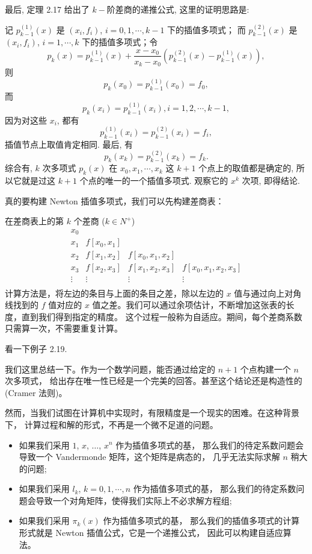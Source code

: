 \documentclass[a4paper]{ctexart}
\begin{document}
最后, 定理 2.17 给出了 $k-$阶差商的递推公式, 这里的证明思路是:

记 $p_{k - 1}^{(1)}(x)$ 是 $(x_i, f_i)$, $i = 0, 1, \cdots, k - 1$ 下的插值多项式；
而 $p_{k - 1}^{(2)}(x)$ 是 $(x_i, f_i)$, $i = 1, \cdots, k$ 下的插值多项式；令
$$
p_k(x) = p_{k - 1}^{(1)}(x)
+ \frac{x - x_0}{x_k - x_0}\left(p_{k - 1}^{(2)}(x) - p_{k - 1}^{(1)}(x)\right),
$$
则
$$
p_k(x_0) = p_{k - 1}^{(1)}(x_0) = f_0,
$$
而
$$
p_k(x_i) = p_{k - 1}^{(1)}(x_i), i = 1, 2, \cdots, k - 1,
$$
因为对这些 $x_i$, 都有
$$
p_{k - 1}^{(1)}(x_i) = p_{k - 1}^{(2)}(x_i) = f_i,
$$
插值节点上取值肯定相同. 最后, 有
$$
p_k(x_k) = p_{k - 1}^{(2)}(x_k) = f_k.
$$
综合有, $k$ 次多项式 $p_k(x)$ 在 $x_0, x_1, \cdots, x_k$ 这 $k + 1$
个点上的取值都是确定的, 所以它就是过这 $k + 1$ 个点的唯一的一个插值多项式. 观察它的 $x^k$ 次项,
即得结论.

真的要构建 Newton 插值多项式，我们可以先构建差商表：

 在差商表上的第 $k$ 个差商 ($k \in N^+$) 
\[
\begin{array}{cccc}
x_0 & & & \\
x_1 & f [x_0, x_1] & & \\
x_2 & f [x_1, x_2] & f [x_0 , x_1, x_2] & \\
x_3 & f [x_2, x_3] & f [x_1 , x_2, x_3] & f [x_0 , x_1 , x_2 , x_3 ] \\
\vdots & \vdots & \vdots & \vdots \\
\end{array}
\]
计算方法是，将左边的条目与上面的条目之差，除以左边的 $x$ 值与通过向上对角线找到的 
$f$ 值对应的 $x$ 值之差。我们可以通过余项估计，不断增加这张表的长度，直到我们得到指定的精度。
这个过程一般称为自适应。期间，每个差商系数只需算一次，不需要重复计算。

看一下例子 2.19.

我们这里总结一下。作为一个数学问题，能否通过给定的 $n + 1$ 个点构建一个 $n$ 次多项式，
给出存在唯一性已经是一个完美的回答。甚至这个结论还是构造性的 (Cramer 法则)。

然而，当我们试图在计算机中实现时，有限精度是一个现实的困难。在这种背景下，
计算过程和解的形式，不再是一个微不足道的问题。

\begin{itemize}
  \item 如果我们采用 $1$, $x$, $\ldots$, $x^n$ 作为插值多项式的基，
  那么我们的待定系数问题会导致一个 Vandermonde 矩阵，这个矩阵是病态的，
  几乎无法实际求解 $n$ 稍大的问题;
  \item 如果我们采用 $l_k$, $k = 0, 1, \cdots, n$ 作为插值多项式的基，
  那么我们的待定系数问题会导致一个对角矩阵，使得我们实际上不必求解方程组;
  \item 如果我们采用 $\pi_k(x)$ 作为插值多项式的基，
  那么我们的插值多项式的计算形式就是 Newton 插值公式，它是一个递推公式，
  因此可以构建自适应算法。
\end{itemize}
\end{document}
